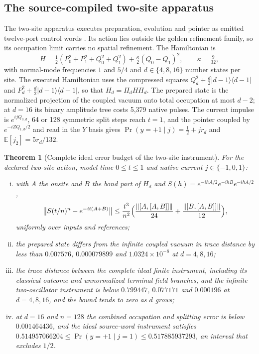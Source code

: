 \documentclass[11pt]{article}
\newtheorem{theorem}{Theorem}[section]
\theoremstyle{definition}
\theoremstyle{remark}
\theoremstyle{plain}
\newcommand{\proj}[1]{\lvert #1\rangle\langle #1\rvert}
\newcommand{\Ex}{\mathbb{E}}
\begin{document}
\subsection{The source-compiled two-site apparatus}
\label{sec:two-site}

The two-site apparatus executes preparation, evolution and pointer as
emitted twelve-port control words \cite{ssREADME,ssDERIV}. Its action lies
outside the golden refinement family, so its occupation limit carries no
spatial refinement. The Hamiltonian is
\[
H=\tfrac12(P_0^2+P_1^2+Q_0^2+Q_1^2)+\tfrac\kappa2(Q_0-Q_1)^2,\qquad
\kappa=\tfrac9{32},
\]
with normal-mode frequencies $1$ and $5/4$ and $d\in\{4,8,16\}$ number states
per site. The executed Hamiltonian uses the compressed squares
$Q_d^2+\frac d2\proj{d-1}$ and $P_d^2+\frac d2\proj{d-1}$, so that
$H_d=\Pi_dH\Pi_d$. The prepared state is the normalized projection of the
coupled vacuum onto total occupation at most $d-2$; at $d=16$ its binary
amplitude tree costs 5,379 native pulses. The current impulse is
$e^{ijQ_{0,d}}$, 64 or 128 symmetric split steps reach $t=1$, and the pointer
coupled by $e^{-iZQ_{1,d}/2}$ and read in the $Y$ basis gives
$\Pr(y=+1\mid j)=\frac12+jr_d$ and $\Ex[j_2]=5r_d/132$.

\begin{theorem}[Complete ideal error budget of the two-site instrument]
\label{thm:two-site}
For the declared two-site action, model time $0\le t\le1$ and native current
$j\in\{-1,0,1\}$:
\begin{enumerate}[(i)]
\item with $A$ the onsite and $B$ the bond part of $H_d$ and
$S(h)=e^{-ihA/2}e^{-ihB}e^{-ihA/2}$,
\[
\bigl\lVert S(t/n)^n-e^{-it(A+B)}\bigr\rVert\le\frac{t^3}{n^2}
\Bigl(\frac{\lVert[A,[A,B]]\rVert}{24}+\frac{\lVert[B,[A,B]]\rVert}{12}\Bigr),
\]
uniformly over inputs and references;
\item the prepared state differs from the infinite coupled vacuum in trace
distance by less than $0.007576$, $0.000079899$ and $1.0324\times10^{-8}$ at
$d=4,8,16$;
\item the trace distance between the complete ideal finite instrument,
including its classical outcome and unnormalized terminal field branches, and
the infinite two-oscillator instrument is below $0.799447$, $0.077171$ and
$0.000196$ at $d=4,8,16$, and the bound tends to zero as $d$ grows;
\item at $d=16$ and $n=128$ the combined occupation and splitting error is
below $0.001464436$, and the ideal source-word instrument satisfies
$0.514957066204\le\Pr(y=+1\mid j=1)\le0.517885937293$, an interval that
excludes $1/2$.
\end{enumerate}
\end{theorem}
\end{document}
